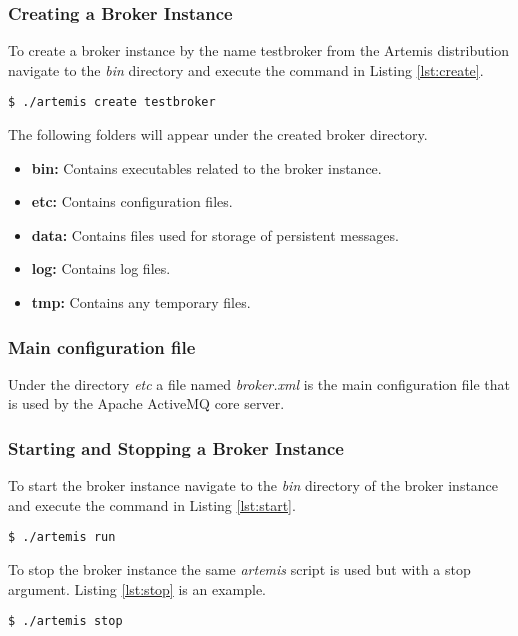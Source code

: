 \subsubsection{Creating a Broker Instance}

To create a broker instance by the name testbroker from the Artemis distribution navigate to the \textit{bin} directory and execute the  command in Listing \ref{lst:create}. 

\bigskip
\begin{lstlisting}[style=BashInputStyle,caption=Creating Broker Instance, label={lst:create}]
  $ ./artemis create testbroker
\end{lstlisting}

The following folders will appear under the created broker directory.

\begin{itemize}
    \item \textbf{bin:}
        Contains executables related to the broker instance.

    \item \textbf{etc:}
        Contains configuration files.

    \item \textbf{data:}
        Contains files used for storage of persistent messages.

    \item \textbf{log:}
        Contains log files.

    \item \textbf{tmp:}
        Contains any temporary files.
         
\end{itemize}

\subsubsection{Main configuration file}

Under the directory \textit{etc} a file named \textit{broker.xml} is the main configuration file that is used by the Apache ActiveMQ core server. 

\subsubsection{Starting and Stopping a Broker Instance}

To start the broker instance navigate to the \textit{bin} directory of the broker instance and execute the command in Listing \ref{lst:start}.

\bigskip
\begin{lstlisting}[style=BashInputStyle,caption=Starting Broker Instance, label={lst:start}]
  $ ./artemis run
\end{lstlisting}

To stop the broker instance the same \textit{artemis} script is used but with a stop argument. Listing \ref{lst:stop} is an example.

\bigskip
\begin{lstlisting}[style=BashInputStyle,caption=Stopping Broker Instance, label={lst:stop}]
  $ ./artemis stop
\end{lstlisting}
